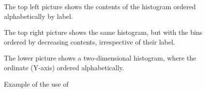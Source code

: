 %
%
%
\begin{figure}[btp]
\caption{Example of the use of \protect{}}
\label{fig:HLABEL}

\begin{UL}
\item The top left picture shows the contents of the histogram ordered
      alphabetically by label.
\item The top right picture shows the same histogram, but with the 
      bins ordered by decreasing contents, irrespective of their label.
\item The lower picture shows a two-dimensional histogram,
      where the ordinate (Y-axis) ordered alphabetically.
\end{UL}
\end{figure}


\clearpage%

